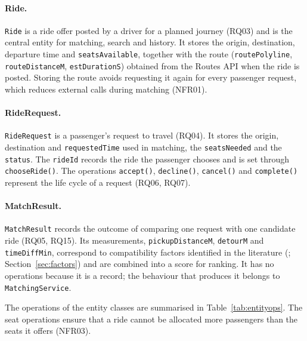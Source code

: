 \paragraph{Ride.} \texttt{Ride} is a ride offer posted by a driver for a planned journey (RQ03) and is the central entity for matching, search and history. It stores the origin, destination, departure time and \texttt{seatsAvailable}, together with the route (\texttt{routePolyline}, \texttt{routeDistanceM}, \texttt{estDurationS}) obtained from the Routes API when the ride is posted. Storing the route avoids requesting it again for every passenger request, which reduces external calls during matching (NFR01).

\paragraph{RideRequest.} \texttt{RideRequest} is a passenger's request to travel (RQ04). It stores the origin, destination and \texttt{requestedTime} used in matching, the \texttt{seatsNeeded} and the \texttt{status}. The \texttt{rideId} records the ride the passenger chooses and is set through \texttt{chooseRide()}. The operations \texttt{accept()}, \texttt{decline()}, \texttt{cancel()} and \texttt{complete()} represent the life cycle of a request (RQ06, RQ07).

\paragraph{MatchResult.} \texttt{MatchResult} records the outcome of comparing one request with one candidate ride (RQ05, RQ15). Its measurements, \texttt{pickupDistanceM}, \texttt{detourM} and \texttt{timeDiffMin}, correspond to compatibility factors identified in the literature (\citealp{stiglic2016}; Section~\ref{sec:factors}) and are combined into a score for ranking. It has no operations because it is a record; the behaviour that produces it belongs to \texttt{MatchingService}.

The operations of the entity classes are summarised in Table~\ref{tab:entityops}. The seat operations ensure that a ride cannot be allocated more passengers than the seats it offers (NFR03).

